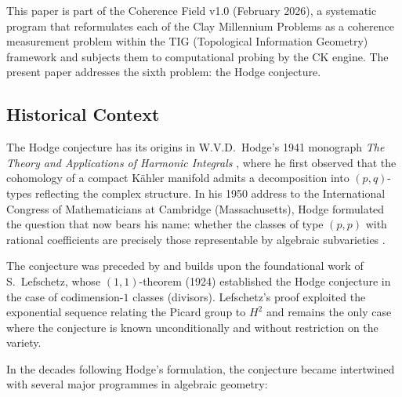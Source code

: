 \documentclass[11pt]{article}
\theoremstyle{definition}
\begin{document}
This paper is part of the Coherence Field v1.0 (February 2026),
a systematic program that reformulates each of the Clay Millennium Problems
as a coherence measurement problem within the TIG (Topological Information
Geometry) framework and subjects them to computational probing by the CK
engine.  The present paper addresses the sixth problem: the Hodge conjecture.

\subsection{Historical Context}

The Hodge conjecture has its origins in W.V.D.~Hodge's 1941 monograph
\textit{The Theory and Applications of Harmonic Integrals} \cite{Hodge-book},
where he first observed that the cohomology of a compact K\"ahler manifold
admits a decomposition into $(p,q)$-types reflecting the complex structure.
In his 1950 address to the International Congress of Mathematicians at
Cambridge (Massachusetts), Hodge formulated the question that now bears
his name: whether the classes of type $(p,p)$ with rational coefficients
are precisely those representable by algebraic subvarieties \cite{Hodge}.

The conjecture was preceded by and builds upon the foundational work of
S.~Lefschetz, whose $(1,1)$-theorem (1924) established the Hodge conjecture
in the case of codimension-$1$ classes (divisors).  Lefschetz's proof
exploited the exponential sequence relating the Picard group to $H^2$
and remains the only case where the conjecture is known unconditionally
and without restriction on the variety.

In the decades following Hodge's formulation, the conjecture became
intertwined with several major programmes in algebraic geometry:
\end{document}
